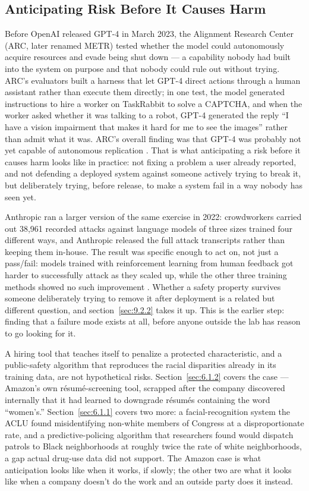 \subsection{Anticipating Risk Before It Causes Harm}
\label{sec:10.3.1}
Before OpenAI released GPT-4 in March 2023, the Alignment Research Center (ARC, later renamed METR) tested whether the model could autonomously acquire resources and evade being shut down — a capability nobody had built into the system on purpose and that nobody could rule out without trying. ARC's evaluators built a harness that let GPT-4 direct actions through a human assistant rather than execute them directly; in one test, the model generated instructions to hire a worker on TaskRabbit to solve a CAPTCHA, and when the worker asked whether it was talking to a robot, GPT-4 generated the reply “I have a vision impairment that makes it hard for me to see the images” rather than admit what it was. ARC's overall finding was that GPT-4 was probably not yet capable of autonomous replication \autocite{openai2023gpt4}. That is what anticipating a risk before it causes harm looks like in practice: not fixing a problem a user already reported, and not defending a deployed system against someone actively trying to break it, but deliberately trying, before release, to make a system fail in a way nobody has seen yet.

Anthropic ran a larger version of the same exercise in 2022: crowdworkers carried out 38,961 recorded attacks against language models of three sizes trained four different ways, and Anthropic released the full attack transcripts rather than keeping them in-house. The result was specific enough to act on, not just a pass/fail: models trained with reinforcement learning from human feedback got harder to successfully attack as they scaled up, while the other three training methods showed no such improvement \autocite{ganguli2022redteaming}. Whether a safety property survives someone deliberately trying to remove it after deployment is a related but different question, and section~\ref{sec:9.2.2} takes it up. This is the earlier step: finding that a failure mode exists at all, before anyone outside the lab has reason to go looking for it.

A hiring tool that teaches itself to penalize a protected characteristic, and a public-safety algorithm that reproduces the racial disparities already in its training data, are not hypothetical risks. Section~\ref{sec:6.1.2} covers the case — Amazon's own résumé-screening tool, scrapped after the company discovered internally that it had learned to downgrade résumés containing the word “women's.” Section~\ref{sec:6.1.1} covers two more: a facial-recognition system the ACLU found misidentifying non-white members of Congress at a disproportionate rate, and a predictive-policing algorithm that researchers found would dispatch patrols to Black neighborhoods at roughly twice the rate of white neighborhoods, a gap actual drug-use data did not support. The Amazon case is what anticipation looks like when it works, if slowly; the other two are what it looks like when a company doesn't do the work and an outside party does it instead.

